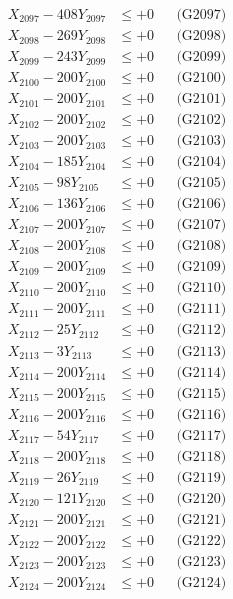 \documentclass[a4paper,10pt]{article}
\begin{document}
{\begin{align}
X_{2097} - 408Y_{2097} &\leq +0 && \text{(G2097)} \\
X_{2098} - 269Y_{2098} &\leq +0 && \text{(G2098)} \\
X_{2099} - 243Y_{2099} &\leq +0 && \text{(G2099)} \\
X_{2100} - 200Y_{2100} &\leq +0 && \text{(G2100)} \\
\allowbreak
X_{2101} - 200Y_{2101} &\leq +0 && \text{(G2101)} \\
X_{2102} - 200Y_{2102} &\leq +0 && \text{(G2102)} \\
X_{2103} - 200Y_{2103} &\leq +0 && \text{(G2103)} \\
X_{2104} - 185Y_{2104} &\leq +0 && \text{(G2104)} \\
X_{2105} - 98Y_{2105} &\leq +0 && \text{(G2105)} \\
X_{2106} - 136Y_{2106} &\leq +0 && \text{(G2106)} \\
X_{2107} - 200Y_{2107} &\leq +0 && \text{(G2107)} \\
X_{2108} - 200Y_{2108} &\leq +0 && \text{(G2108)} \\
X_{2109} - 200Y_{2109} &\leq +0 && \text{(G2109)} \\
X_{2110} - 200Y_{2110} &\leq +0 && \text{(G2110)} \\
\allowbreak
X_{2111} - 200Y_{2111} &\leq +0 && \text{(G2111)} \\
X_{2112} - 25Y_{2112} &\leq +0 && \text{(G2112)} \\
X_{2113} - 3Y_{2113} &\leq +0 && \text{(G2113)} \\
X_{2114} - 200Y_{2114} &\leq +0 && \text{(G2114)} \\
X_{2115} - 200Y_{2115} &\leq +0 && \text{(G2115)} \\
X_{2116} - 200Y_{2116} &\leq +0 && \text{(G2116)} \\
X_{2117} - 54Y_{2117} &\leq +0 && \text{(G2117)} \\
X_{2118} - 200Y_{2118} &\leq +0 && \text{(G2118)} \\
X_{2119} - 26Y_{2119} &\leq +0 && \text{(G2119)} \\
X_{2120} - 121Y_{2120} &\leq +0 && \text{(G2120)} \\
\allowbreak
X_{2121} - 200Y_{2121} &\leq +0 && \text{(G2121)} \\
X_{2122} - 200Y_{2122} &\leq +0 && \text{(G2122)} \\
X_{2123} - 200Y_{2123} &\leq +0 && \text{(G2123)} \\
X_{2124} - 200Y_{2124} &\leq +0 && \text{(G2124)} \\

\end{align}}
\end{document}
